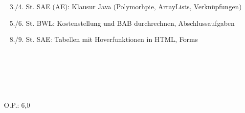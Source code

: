{{	\textbullet~ 3./4. St. SAE (AE): Klausur Java (Polymorhpie, ArrayLists, Verknüpfungen)\par
	\textbullet~ 5./6. St. BWL: Kostenstellung und BAB durchrechnen, Abschlussaufgaben\par
	\textbullet~ 8./9. St. SAE: Tabellen mit Hoverfunktionen in HTML, Forms\par
	\textbullet~ \par
	\textbullet~ \par
	\textbullet~ 
	}{}{O.P.: 6,0}
}{}
\Unterschrift
\newpage
